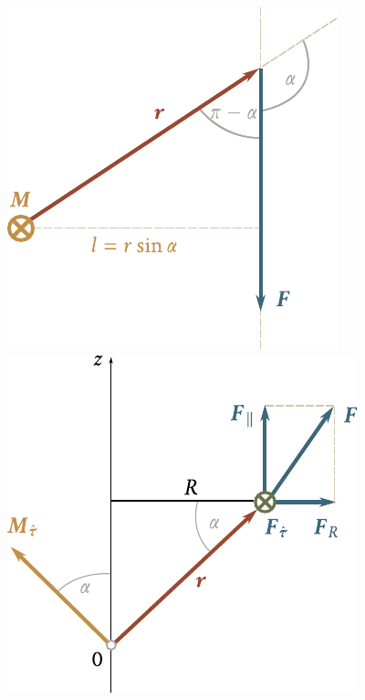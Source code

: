 \begin{figure}[!htb]
	\begin{minipage}[t]{0.5\linewidth}
		\begin{center}
			\includegraphics[scale=0.9]{figures/ch_03/fig_3_20.pdf}
			\caption[]{}
			\label{fig:3_20}
		\end{center}
	\end{minipage}
	\hspace{-0.05cm}
	\begin{minipage}[t]{0.5\linewidth}
		\begin{center}
			\includegraphics[scale=0.9]{figures/ch_03/fig_3_21.pdf}
			\caption[]{}
			\label{fig:3_21}
		\end{center}
	\end{minipage}
\end{figure}

